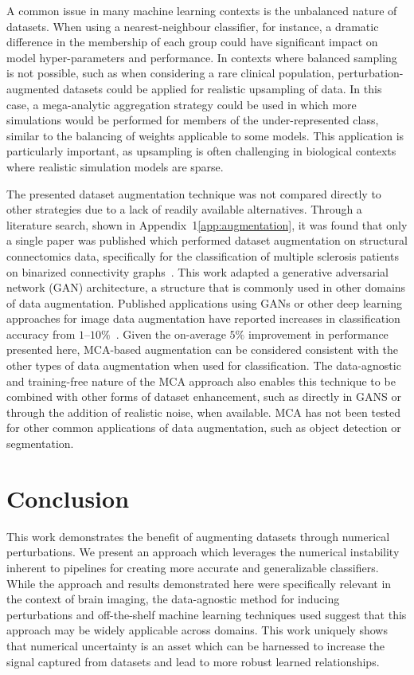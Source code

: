 \documentclass[10pt]{SelfArx} %
\newcommand{\new}[1]{\color{blue}#1\color{black}\xspace}
\begin{document}
A common issue in many machine learning contexts is the unbalanced nature of datasets. When using a nearest-neighbour
classifier, for instance, a dramatic difference in the membership of each group could have significant impact on model
hyper-parameters and performance. In contexts where balanced sampling is not possible, such as when considering a rare
clinical population, perturbation-augmented datasets could be applied for realistic upsampling of data. In this case, a
mega-analytic aggregation strategy could be used in which more simulations would be performed for members of the
under-represented class, similar to the balancing of weights applicable to some models. This application is
particularly important, as upsampling is often challenging in biological contexts where realistic simulation models are
sparse.

\new{The presented dataset augmentation technique was not compared directly to other strategies due to a lack of
readily available alternatives. Through a literature search, shown in Appendix~1\ref{app:augmentation}, it was found
that only a single paper was published which performed dataset augmentation on structural connectomics data,
specifically for the classification of multiple sclerosis patients on binarized connectivity
graphs~\cite{barile2021data}. This work adapted a generative adversarial network (GAN) architecture, a structure that
is commonly used in other domains of data augmentation. Published applications using GANs or other deep learning
approaches for image data augmentation have reported increases in classification accuracy from
$1–10\%$~\cite{shorten2019survey}. Given the on-average $5\%$ improvement in performance presented here, MCA-based
augmentation can be considered consistent with the other types of data augmentation when used for classification. The
data-agnostic and training-free nature of the MCA approach also enables this technique to be combined with other forms
of dataset enhancement, such as directly in GANS or through the addition of realistic noise, when available. MCA has
not been tested for other common applications of data augmentation, such as object detection or segmentation.}


\section*{Conclusion}

This work demonstrates the benefit of augmenting datasets through numerical perturbations. We present an approach which
leverages the numerical instability inherent to pipelines for creating more accurate and generalizable classifiers.
While the approach and results demonstrated here were specifically relevant in the context of brain imaging, the
data-agnostic method for inducing perturbations and off-the-shelf machine learning techniques used suggest that this
approach may be widely applicable across domains. This work uniquely shows that numerical uncertainty is an asset which
can be harnessed to increase the signal captured from datasets and lead to more robust learned relationships.
\end{document}
